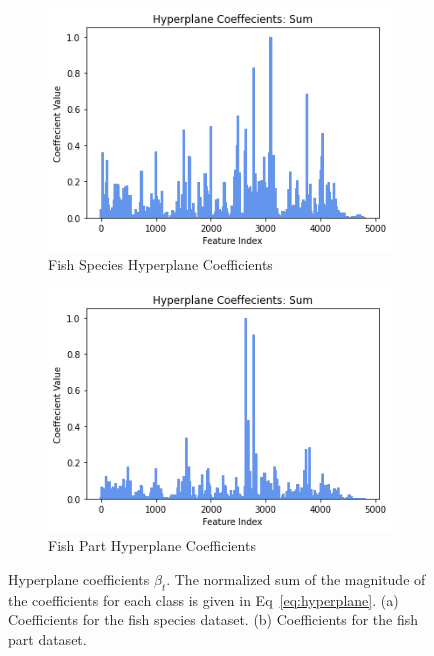 \documentclass[runningheads]{llncs}
\begin{document}
\begin{figure}[htb]
  \centering
  \begin{subfigure}[b]{\linewidth}
    \includegraphics[width=1\linewidth]{fish_total_coefficients.png}
    \caption{Fish Species Hyperplane Coefficients}
    \label{fig:fish-hyperplane-coeffcients}
  \end{subfigure}

  \begin{subfigure}[b]{\linewidth}
    \includegraphics[width=1\linewidth]{part_total_coefficients.png}
    \caption{Fish Part Hyperplane Coefficients}
    \label{fig:part-hyperplane-coeffcients}
  \end{subfigure}

  \caption[Two numerical solutions]{
    Hyperplane coefficients $\beta_t$.
    The normalized sum of the magnitude of the coefficients for each class is given in Eq~\ref{eq:hyperplane}.
    (a) Coefficients for the fish species dataset.
    (b) Coefficients for the fish part dataset.}
  \label{fig:hyperplane-coefficients}
\end{figure}
\end{document}
